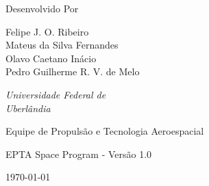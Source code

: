\begin{titlepage}
\begin{minipage}[h!]{0.6\textwidth}
		\vspace*{3\baselineskip} %
	
	
		Desenvolvido Por
	
		\vspace{0.5\baselineskip} %
		
        {
        Felipe J. O. Ribeiro \\ 
        Mateus da Silva Fernandes \\ 
        Olavo Caetano Inácio \\
        Pedro Guilherme R. V. de Melo
        } %
        
		
        \vspace{0.5\baselineskip} %
	
		\textit{Universidade Federal de \\ Uberlândia} %
	
		\vspace{12.8\baselineskip} %
	
		{\large Equipe de Propulsão e Tecnologia Aeroespacial} %
		
		\vspace{0.3\baselineskip} %
		
		EPTA Space Program - Versão 1.0 %
		
		\vspace{0.3\baselineskip} %
		
		\today %
		
	\end{minipage}



\end{titlepage}

